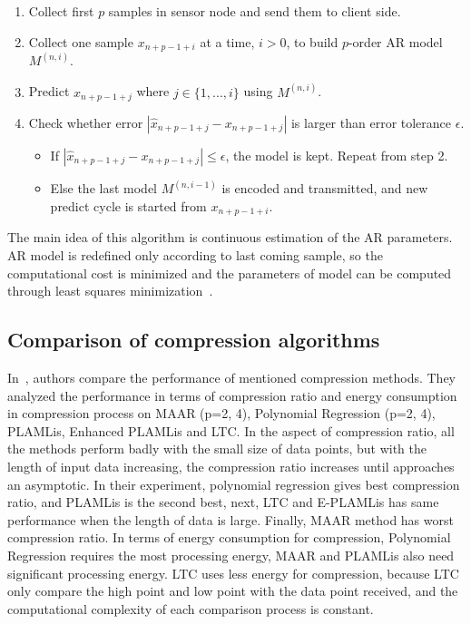 \begin{enumerate}
    \item Collect first $p$ samples in sensor node and send them to client side.
    \item Collect one sample $x_{n+p-1+i}$ at a time, $i > 0$, to build
    $p$-order
    AR model $M^{(n, i)}$.
    \item Predict $x_{n+p-1+j}$ where $j \in \{1, ..., i\}$ using $M^{(n, i)}$.
    \item Check whether error $ |\hat{x}_{n+p-1+j} - x_{n+p-1+j}|$ is larger
    than error tolerance $\epsilon$.
        \begin{itemize}
            \item If $|\hat{x}_{n+p-1+j} - x_{n+p-1+j}| \leqslant \epsilon$, the
            model is kept. Repeat from step 2.
            \item Else the last model $M^{(n, i-1)}$ is encoded and transmitted,
            and new predict cycle is started from $x_{n+p-1+i}$.
        \end{itemize} 
\end{enumerate}
The main idea of this algorithm is continuous estimation of the AR parameters.
AR model is redefined only according to last coming sample, so the computational
cost is minimized and the parameters of model can be computed through least
squares minimization~\cite{zordan2012compress}.


\subsection{Comparison of compression algorithms}
\label{sec:comparision-lossy}
In~\cite{zordan2014performance}, authors compare the performance of mentioned
compression methods. They analyzed the performance in terms of compression ratio
and energy consumption in compression process on MAAR (p={2, 4}), Polynomial
Regression (p={2, 4}), PLAMLis, Enhanced PLAMLis and LTC. In the aspect of
compression ratio, all the methods perform badly with the small size of data
points, but with the length of input data increasing, the compression ratio
increases until approaches an asymptotic. In their experiment, polynomial
regression gives best compression ratio, and PLAMLis is the second best, next,
LTC and E-PLAMLis has same performance when the length of data is large.
Finally, MAAR method has worst compression ratio. In terms of energy consumption
for compression, Polynomial Regression requires the most processing energy, MAAR
and PLAMLis also need significant processing energy. LTC uses less energy for
compression, because LTC only compare the high point and low point
with the data point received, and the computational complexity of each
comparison process is constant.
